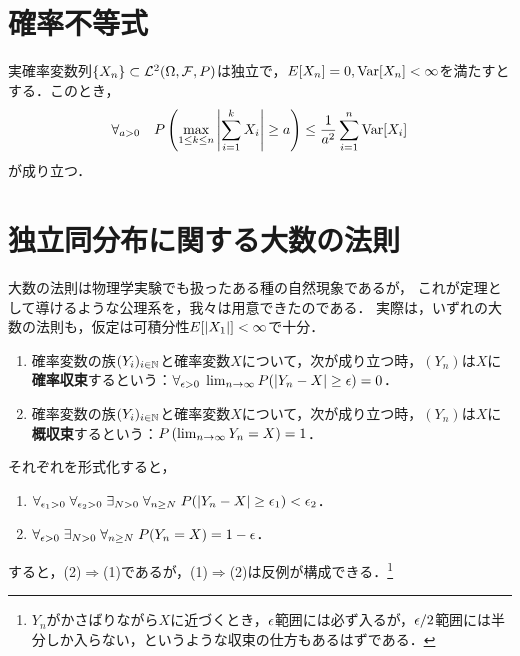 \documentclass[uplatex,dvipdfmx]{jsreport}
\begin{document}
\section{確率不等式}

\begin{theorem}[Kolmogorov]
    実確率変数列$\{X_n\}\subset\mathcal{L}^2(\Omega,\mathcal{F},P)$は独立で，$E[X_n]=0,\mathrm{Var}[X_n]<\infty$を満たすとする．このとき，
    \[\forall_{a>0}\quad P\left(\max_{1\le k\le n}\left|\sum^k_{i=1}X_i\right|\ge a\right)\le\frac{1}{a^2}\sum^n_{i=1}\mathrm{Var}[X_i]\]
    が成り立つ．
\end{theorem}
\begin{remarks}[martingaleの萌芽]
    
\end{remarks}

\section{独立同分布に関する大数の法則}

\begin{tcolorbox}[colframe=ForestGreen, colback=ForestGreen!10!white,breakable,colbacktitle=ForestGreen!40!white,coltitle=black,fonttitle=\bfseries\sffamily,
title=]
    大数の法則は物理学実験でも扱ったある種の自然現象であるが，
    これが定理として導けるような公理系を，我々は用意できたのである．
    実際は，いずれの大数の法則も，仮定は可積分性$E[\lvert X_1\rvert]<\infty$で十分．
\end{tcolorbox}

\begin{definition}\mbox{}
    \begin{enumerate}
        \item 確率変数の族$(Y_i)_{i\in\mathbb{N}}$と確率変数$X$について，次が成り立つ時，$(Y_n)$は$X$に\textbf{確率収束}するという：$\forall_{\epsilon>0}\;\lim_{n\to\infty}P(\lvert Y_n-X\rvert\ge\epsilon)=0$．
        \item 確率変数の族$(Y_i)_{i\in\mathbb{N}}$と確率変数$X$について，次が成り立つ時，$(Y_n)$は$X$に\textbf{概収束}するという：$P\left(\lim_{n\to\infty}Y_n=X\right)=1$．
    \end{enumerate}
    それぞれを形式化すると，
    \begin{enumerate}
        \item $\forall_{\epsilon_1>0}\;\forall_{\epsilon_2>0}\;\exists_{N>0}\;\forall_{n\ge N}\;P(\left|Y_n-X\right|\ge\epsilon_1)<\epsilon_2$．
        \item $\forall_{\epsilon>0}\;\exists_{N>0}\;\forall_{n\ge N}\;P(Y_n=X)=1-\epsilon$．
    \end{enumerate}
    すると，(2)$\Rightarrow$(1)であるが，(1)$\Rightarrow$(2)は反例が構成できる．\footnote{$Y_n$がかさばりながら$X$に近づくとき，$\epsilon$範囲には必ず入るが，$\epsilon/2$範囲には半分しか入らない，というような収束の仕方もあるはずである．}
\end{definition}
\end{document}
